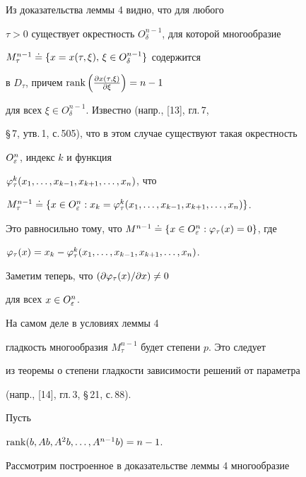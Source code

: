 \begin{pf}


Из доказательства леммы 4 видно, что для любого


$\tau>0$ существует окрестность $O^{n-1}_{\delta}$, для которой многообразие


$M^{n-1}_{\tau}\doteq\{x=x(\tau,\xi),\,\xi\in O^{n-1}_{\delta}\}$ содержится


в $D_{\tau}$, причем $\operatorname{rank}\left(\frac{\partial x(\tau,\xi)}{\partial\xi}\right)=n-1$


для всех $\xi\in O^{n-1}_{\delta}$. Известно (напр., [13], гл.\,7,


\S\,7, утв.\,1, с.\,505), что в этом случае существуют такая окрестность


$O^n_{\varepsilon}$, индекс $k$ и функция


$\varphi^k_{\tau}(x_1,\dotsc,x_{k-1},x_{k+1},\dotsc,x_n)$, что


$M^{n-1}_{\tau}\de\{x\in O^n_{\ve}:


x_k=\vfi^k_{\tau}(x_1,\dotsc,x_{k-1},x_{k+1},\dotsc,x_n)\}$.


Это равносильно тому, что $M^{n-1}\de\{x\in


O^n_{\ve}:\vfi_{\tau}(x)=0\}$, где


$\varphi_{\tau}(x)=x_k-\varphi^k_{\tau}(x_1,\dotsc,x_{k-1},x_{k+1},\dotsc,x_n)$.


Заметим теперь, что $(\partial\varphi_{\tau}(x)/\partial x)\ne 0$


для всех $x\in O^n_{\varepsilon}$.


\end{pf}





\begin{note}


На самом деле в условиях леммы 4


гладкость многообразия $M^{n-1}_{\tau}$ будет степени $p$. Это следует


из теоремы о степени гладкости зависимости решений от параметра


(напр., [14], гл.\,3, \S\,21, с.\,88).


\end{note}





Пусть


$\operatorname{rank}(b,Ab,A^2b,\dotsc,A^{n-1}b)=n-1$.


Рассмотрим построенное в доказательстве леммы 4 многообразие


